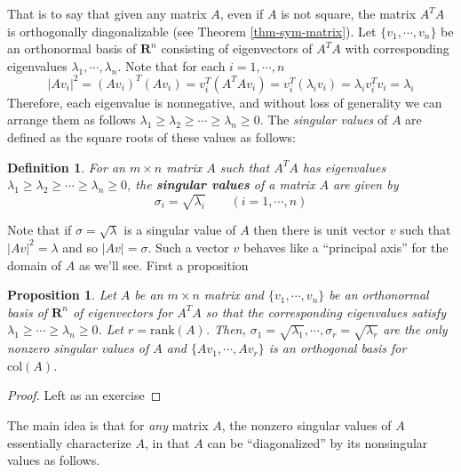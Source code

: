 \documentclass[12pt]{article}
\numberwithin{equation}{subsection}
\numberwithin{figure}{subsection}
\newtheorem{defn}[subsection]{Definition}
\newtheorem{prop}[subsection]{Proposition}
\theoremstyle{note}
\newcommand{\R}{\mathbf{R}}
\newcommand\col[1]{\mathrm{col}(#1)}
\newcommand\rank[1]{\mathrm{rank}(#1)}
\begin{document}
That is to say that given any matrix $A$, even if $A$ is not square, the matrix $A^TA$ is orthogonally diagonalizable (see Theorem \ref{thm-sym-matrix}). Let $\{v_1,\cdots,v_n\}$ be an orthonormal basis of $\R^n$ consisting of eigenvectors of $A^TA$ with corresponding eigenvalues $\lambda_1,\cdots,\lambda_n$. 
Note that for each $i=1,\cdots,n$ \begin{equation}
	|Av_i|^2=(Av_i)^T(Av_i)=v_i^T(A^TAv_i)=v_i^T(\lambda_iv_i)=\lambda_i v_i^Tv_i=\lambda_i
\end{equation}
Therefore, each eigenvalue is nonnegative, and without loss of generality we can arrange them as follows $\lambda_1 \geq \lambda_2\geq \cdots \geq \lambda_n\geq 0$. The \textit{singular values} of $A$ are defined as the square roots of these values as follows:

\begin{defn} For an $m\times n$ matrix $A$ such that $A^TA$ has eigenvalues $\lambda_1\geq \lambda_2\geq\cdots\geq \lambda_n\geq0$, the \textbf{singular values} of a matrix $A$ are given by \begin{equation} \sigma_i=\sqrt{\lambda_i} \qquad  (i=1,\cdots,n)\end{equation}
\end{defn}
Note that if $\sigma=\sqrt{\lambda}$ is a singular value of $A$ then there is unit vector $v$ such that $|Av|^2=\lambda$ and so $|Av|=\sigma$. Such a vector $v$ behaves like a ``principal axis'' for the domain of $A$ as we'll see. First a proposition

\begin{prop}\label{prop:symrank}
	Let $A$ be an $m\times n$ matrix and $\{v_1,\cdots,v_n\}$ be an orthonormal basis of $\R^n$ of eigenvectors for $A^TA$ so that the corresponding eigenvalues satisfy $\lambda_1\geq \cdots \geq \lambda_n\geq 0$. Let $r=\rank{A}$. Then, $\sigma_1=\sqrt{\lambda_1},\cdots,\sigma_r=\sqrt{\lambda_r}$ are the only nonzero singular values of $A$ and $\{Av_1,\cdots,Av_r\}$ is an orthogonal basis for $\col{A}$.

\end{prop}

\begin{proof} Left as an exercise\end{proof}
The main idea is that for \textit{any} matrix $A$, the nonzero singular values of $A$ essentially characterize $A$, in that $A$ can be ``diagonalized'' by its nonsingular values as follows.
\end{document}
